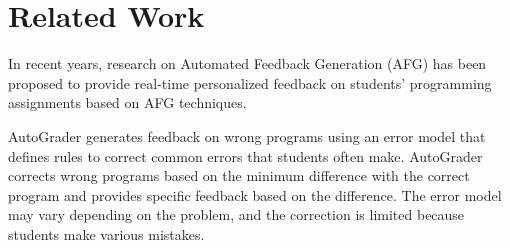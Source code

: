 \documentclass[10pt,conference]{IEEEtran}
\begin{document}
\section{Related Work}
        In recent years, research on Automated Feedback Generation (AFG) has been proposed to provide real-time personalized feedback on students' programming assignments based on AFG techniques.
        
        AutoGrader\cite{singh2013automated} generates feedback on wrong programs using an error model that defines rules to correct common errors that students often make. AutoGrader corrects wrong programs based on the minimum difference with the correct program and provides specific feedback based on the difference. The error model may vary depending on the problem, and the correction is limited because students make various mistakes.
        
        
\end{document}
